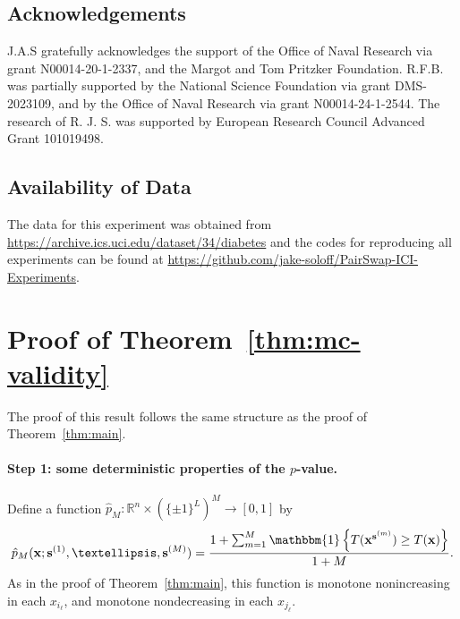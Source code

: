 \documentclass[12pt]{article}
\newcommand{\R}{\mathbb{R}}
\newcommand{\One}[1]{{\mathbbm{1}}\left\{{#1}\right\}}
\newcommand{\bs}{\mathbf{s}}
\newcommand{\bx}{\mathbf{x}}
\begin{document}
\subsection*{Acknowledgements}
J.A.S gratefully acknowledges the support of the Office of Naval Research via grant N00014-20-1-2337, and the Margot and Tom Pritzker Foundation.
R.F.B. was partially supported by the National Science Foundation via grant DMS-2023109, and by the Office of Naval Research via grant N00014-24-1-2544. The research of R. J. S. was supported by European Research Council Advanced Grant 101019498.

\subsection*{Availability of Data}
The data for this experiment was obtained from \url{https://archive.ics.uci.edu/dataset/34/diabetes} and the codes for reproducing all experiments can be found at \url{https://github.com/jake-soloff/PairSwap-ICI-Experiments}.

 
 

\appendix
{}
\renewcommand{\thetheorem}{\Alph{section}.\arabic{theorem}}
\renewcommand{\thelemma}{\Alph{section}.\arabic{lemma}}

\section{Proof of Theorem~\ref{thm:mc-validity}}\label{app:proof-mc-validity}
The proof of this result follows the same structure as the proof of Theorem~\ref{thm:main}. 
\paragraph{Step 1: some deterministic properties of the $p$-value.}
Define a function $\hat{p}_M:\R^n\times (\{\pm 1\}^L)^M\to [0,1]$ by
\[
\hat{p}_M(\bx; \bs^{(1)},\dots,\bs^{(M)}) = \frac{1 +\sum_{m=1}^M \One{T(\bx^{\bs^{(m)}})\geq T(\bx)}}{1+M}.
\]
As in the proof of Theorem~\ref{thm:main}, this function is monotone nonincreasing in each $x_{i_\ell}$, and monotone nondecreasing in each $x_{j_\ell}$.
\end{document}
